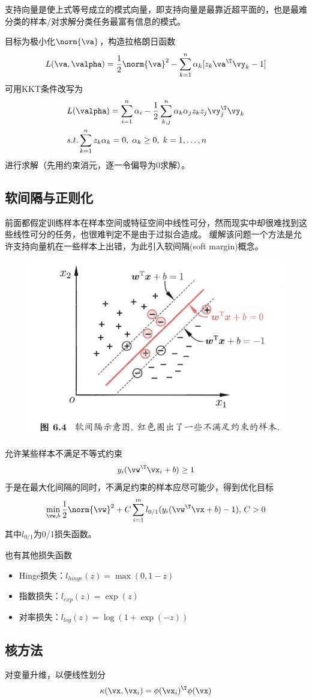 支持向量是使上式等号成立的模式向量，即支持向量是最靠近超平面的，也是最难分类的样本/对求解分类任务最富有信息的模式。

目标为极小化$\norm{\va}$，构造拉格朗日函数
\[L(\va,\valpha)=\frac{1}{2}\norm{\va}^2-\sum_{k=1}^n\alpha_k[z_k\va^\T\vy_k-1]\]
可用KKT条件改写为
\[\begin{aligned}
&L(\valpha)=\sum_{i=1}^n\alpha_i-\frac{1}{2}\sum_{k,j}^n\alpha_k\alpha_jz_kz_j\vy_j^\T\vy_k\\
&s.t.\sum_{k=1}^nz_k\alpha_k=0,\;\alpha_k\geq 0,\;k=1,\ldots,n
\end{aligned}\]
进行求解（先用约束消元，逐一令偏导为$0$求解）。

\subsection{软间隔与正则化}
前面都假定训练样本在样本空间或特征空间中线性可分，然而现实中却很难找到这些线性可分的任务，也很难判定不是由于过拟合造成。
缓解该问题一个方法是允许支持向量机在一些样本上出错，为此引入软间隔(soft margin)概念。
\begin{figure}[H]
\centering
\includegraphics[width=0.6\linewidth]{fig/soft_margin.png}
\end{figure}

允许某些样本不满足不等式约束
\[y_i(\vw^\T\vx_i+b)\geq 1\]
于是在最大化间隔的同时，不满足约束的样本应尽可能少，得到优化目标
\[\min_{\vw,b}\frac{1}{2}\norm{\vw}^2+C\sum_{i=1}^ml_{0/1}(y_i(\vw^\T\vx+b)-1),\,C>0\]
其中$l_{0/1}$为0/1损失函数。

也有其他损失函数
\begin{itemize}
	\item Hinge损失：$l_{hinge}(z)=\max(0,1-z)$
	\item 指数损失：$l_{exp}(z)=\exp(z)$
	\item 对率损失：$l_{log}(z)=\log(1+\exp(-z))$
\end{itemize}

\subsection{核方法}
对变量升维，以便线性划分
\[\kappa(\vx,\vx_i)=\phi(\vx_i)^\T\phi(\vx)\]

